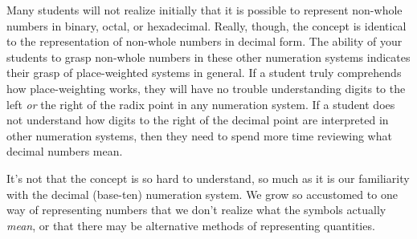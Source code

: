 





Many students will not realize initially that it is possible to represent non-whole numbers in binary, octal, or hexadecimal.  Really, though, the concept is identical to the representation of non-whole numbers in decimal form.  The ability of your students to grasp non-whole numbers in these other numeration systems indicates their grasp of place-weighted systems in general.  If a student truly comprehends how place-weighting works, they will have no trouble understanding digits to the left {\it or} the right of the radix point in any numeration system.  If a student does not understand how digits to the right of the decimal point are interpreted in other numeration systems, then they need to spend more time reviewing what decimal numbers mean.

It's not that the concept is so hard to understand, so much as it is our familiarity with the decimal (base-ten) numeration system.  We grow so accustomed to one way of representing numbers that we don't realize what the symbols actually {\it mean}, or that there may be alternative methods of representing quantities.




